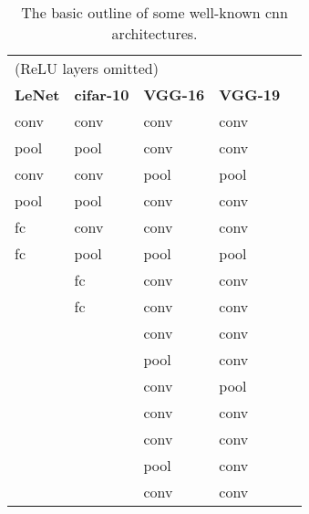 \begin{table}[]
\centering
\caption[Some well-known cnn architectures]{The basic outline of some well-known cnn architectures.}
\label{tbl:cnns}
\begin{tabular}{|l|l|l|l|l}
\cline{1-4}
\multicolumn{4}{|l|}{(ReLU layers omitted)} &  \\ \cline{1-4}
\textbf{LeNet}   & \textbf{cifar-10}      	& \textbf{VGG-16}         & \textbf{VGG-19}         &  \\ \cline{1-4}
conv             & conv     				& conv                    & conv                    &  \\ \cline{1-4}
pool             & pool     				& conv                    & conv                    &  \\ \cline{1-4}
conv             & conv     				& pool                    & pool                    &  \\ \cline{1-4}
pool             & pool  				    & conv                    & conv                    &  \\ \cline{1-4}
fc               & conv   				    & conv                    & conv                    &  \\ \cline{1-4}
fc               & pool     				& pool                    & pool                    &  \\ \cline{1-4}
                 & fc     					& conv                    & conv                    &  \\ \cline{1-4}
                 & fc      					& conv                    & conv                    &  \\ \cline{1-4}
                &       						& conv                    & conv                    &  \\ \cline{1-4}
                &       						& pool                    & conv                    &  \\ \cline{1-4}
                &      						& conv                    & pool                    &  \\ \cline{1-4}
                &       						& conv                    & conv                    &  \\ \cline{1-4}
                &       						& conv                    & conv                    &  \\ \cline{1-4}
                &      						& pool                    & conv                    &  \\ \cline{1-4}
                &       						& conv                    & conv                    &  \\ \cline{1-4}

\end{tabular}
\end{table}
